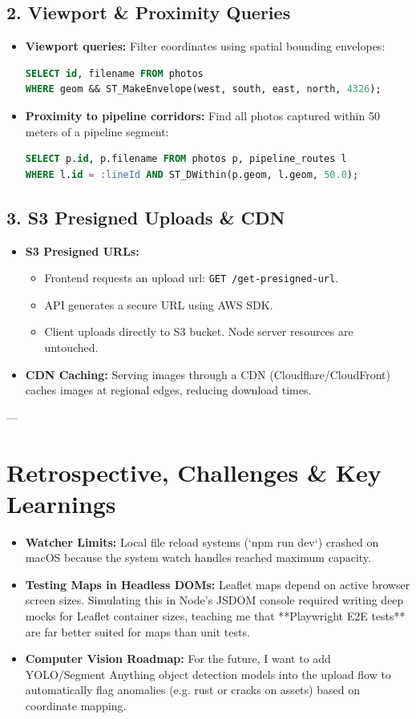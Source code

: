 \documentclass[11pt]{article}
\begin{document}
\subsection{2. Viewport & Proximity Queries}
\begin{itemize}
    \item \textbf{Viewport queries:} Filter coordinates using spatial bounding envelopes:
\begin{lstlisting}[language=SQL]
SELECT id, filename FROM photos 
WHERE geom && ST_MakeEnvelope(west, south, east, north, 4326);
\end{lstlisting}
    \item \textbf{Proximity to pipeline corridors:} Find all photos captured within 50 meters of a pipeline segment:
\begin{lstlisting}[language=SQL]
SELECT p.id, p.filename FROM photos p, pipeline_routes l
WHERE l.id = :lineId AND ST_DWithin(p.geom, l.geom, 50.0);
\end{lstlisting}
\end{itemize}

\subsection{3. S3 Presigned Uploads & CDN}
\begin{itemize}
    \item \textbf{S3 Presigned URLs:}
      \begin{itemize}
        \item Frontend requests an upload url: \texttt{GET /get-presigned-url}.
        \item API generates a secure URL using AWS SDK.
        \item Client uploads directly to S3 bucket. Node server resources are untouched.
      \end{itemize}
    \item \textbf{CDN Caching:} Serving images through a CDN (Cloudflare/CloudFront) caches images at regional edges, reducing download times.
\end{itemize}

---

\section{Retrospective, Challenges \& Key Learnings}
\begin{itemize}
    \item \textbf{Watcher Limits:} Local file reload systems (`npm run dev`) crashed on macOS because the system watch handles reached maximum capacity.
    \item \textbf{Testing Maps in Headless DOMs:} Leaflet maps depend on active browser screen sizes. Simulating this in Node's JSDOM console required writing deep mocks for Leaflet container sizes, teaching me that **Playwright E2E tests** are far better suited for maps than unit tests.
    \item \textbf{Computer Vision Roadmap:} For the future, I want to add YOLO/Segment Anything object detection models into the upload flow to automatically flag anomalies (e.g. rust or cracks on assets) based on coordinate mapping.
\end{itemize}
\end{document}
